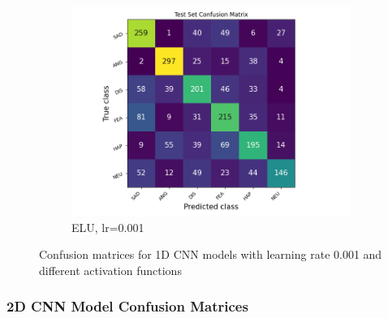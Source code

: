 \begin{figure}[h]
\begin{subfigure}[b]{0.32\textwidth}
    \end{subfigure}
    \begin{subfigure}[b]{0.32\textwidth}
        \includegraphics[width=\textwidth]{1D/lr0.001-ELU-1D-CF.png}
        \caption{ELU, lr=0.001}
    \end{subfigure}
    \caption{Confusion matrices for 1D CNN models with learning rate 0.001 and different activation functions}
    \label{fig:1d_confusion_matrices}
\end{figure}

\subsubsection{2D CNN Model Confusion Matrices}

